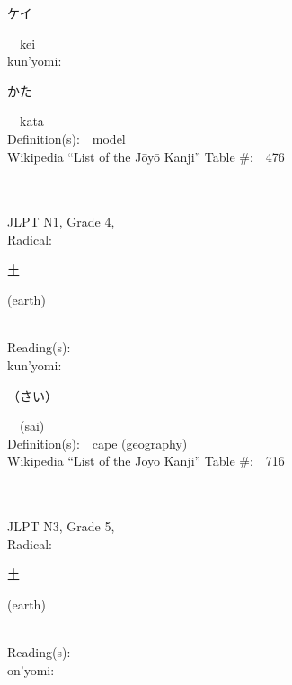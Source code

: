\begin{multicols}{2}
{\hspace*{2em}}{\begin{CJK}{UTF8}{min} ケイ \end{CJK}}\ \ kei\ \ \\
{\hspace*{1em}}kun'yomi:\ \ \\
{\hspace*{2em}}{\begin{CJK}{UTF8}{min} かた \end{CJK}}\ \ kata\ \ \\
Definition(s):\ \ model \\
Wikipedia ``List of the J\=oy\=o Kanji'' Table \#:\ \ 476 \\
\ \ \\
{\fontsize{34pt}{40pt}  }\ \ \\  %
{JLPT N1, Grade 4, \\Radical:\ \ {\begin{CJK}{UTF8}{min} 土 \end{CJK}} (earth) } \\
Reading(s):\ \ \\
{\hspace*{1em}}kun'yomi:\ \ \\
{\hspace*{2em}}{\begin{CJK}{UTF8}{min} （さい） \end{CJK}}\ \ (sai)\ \ \\
Definition(s):\ \ cape (geography) \\
Wikipedia ``List of the J\=oy\=o Kanji'' Table \#:\ \ 716 \\
\ \ \\
{\fontsize{34pt}{40pt}  }\ \ \\  %
{JLPT N3, Grade 5, \\Radical:\ \ {\begin{CJK}{UTF8}{min} 土 \end{CJK}} (earth) } \\
Reading(s):\ \ \\
{\hspace*{1em}}on'yomi:\ \ \\

\end{multicols}
